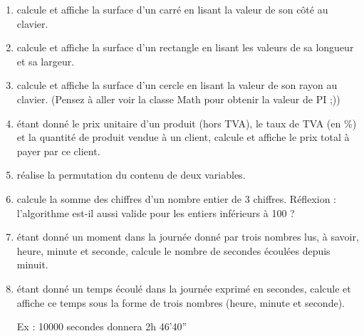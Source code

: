 \documentclass[11pt,a4paper]{article}
\begin{document}
					\begin{enumerate}
				
			\item calcule et affiche la surface d'un carr\'e en lisant la valeur de son c\^ot\'e au clavier.
			\item calcule et affiche la surface d'un rectangle  en lisant les valeurs de sa longueur et sa largeur.
			\item calcule et affiche la surface d'un cercle en lisant la valeur de son rayon au clavier.  (Pensez \`a aller voir la classe Math pour obtenir la valeur de PI ;))
			\item \'etant donn\'e le prix unitaire d'un produit (hors TVA), le taux de TVA (en \%) 
            et la quantit\'e de produit vendue \`a un client, calcule et affiche le prix total \`a payer par ce client.
			\item r\'ealise la permutation du contenu de deux variables.
			\item calcule la somme des chiffres d'un nombre entier de 3 chiffres. R\'eflexion : l'algorithme est-il aussi valide pour les entiers inf\'erieurs \`a 100 ?
			\item \'etant donn\'e un moment dans la journ\'ee donn\'e par trois nombres lus, \`a savoir, heure, minute et seconde, calcule le nombre de secondes \'ecoul\'ees depuis minuit.
			\item \'etant donn\'e un temps \'ecoul\'e dans la journ\'ee exprim\'e en secondes, calcule et affiche ce temps sous la forme de trois nombres (heure, minute et seconde). \par
				
            Ex : 10000 secondes donnera 2h 46'40”
					\end{enumerate}
				
            \par
        
				
\end{document}
